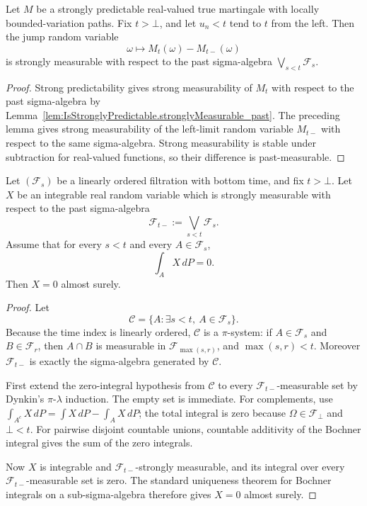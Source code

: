 \begin{lemma}\label{lem:Martingale.stronglyMeasurable_jump_leftLim_past_of_left_approach}
Let \(M\) be a strongly predictable real-valued true martingale with locally
bounded-variation paths.  Fix \(t>\bot\), and let \(u_n<t\) tend to \(t\)
from the left.  Then the jump random variable
\[
  \omega\longmapsto M_t(\omega)-M_{t-}(\omega)
\]
is strongly measurable with respect to the past sigma-algebra
\(\bigvee_{s<t}\mathcal F_s\).
\end{lemma}

\begin{proof}
Strong predictability gives strong measurability of \(M_t\) with respect to
the past sigma-algebra by
Lemma~\ref{lem:IsStronglyPredictable.stronglyMeasurable_past}.  The preceding
lemma gives strong measurability of the left-limit random variable
\(M_{t-}\) with respect to the same sigma-algebra.  Strong measurability is
stable under subtraction for real-valued functions, so their difference is
past-measurable.
\end{proof}

\begin{lemma}\label{lem:Filtration.ae_eq_zero_of_past_setIntegral_eq_zero}
Let \((\mathcal F_s)\) be a linearly ordered filtration with bottom time, and
fix \(t>\bot\).  Let \(X\) be an integrable real random variable which is
strongly measurable with respect to the past sigma-algebra
\[
  \mathcal F_{t-}:=\bigvee_{s<t}\mathcal F_s .
\]
Assume that for every \(s<t\) and every \(A\in\mathcal F_s\),
\[
  \int_A X\,dP=0 .
\]
Then \(X=0\) almost surely.
\end{lemma}

\begin{proof}
Let
\[
  \mathcal C=\{A:\exists s<t,\ A\in\mathcal F_s\}.
\]
Because the time index is linearly ordered, \(\mathcal C\) is a
\(\pi\)-system: if \(A\in\mathcal F_s\) and \(B\in\mathcal F_r\), then
\(A\cap B\) is measurable in \(\mathcal F_{\max(s,r)}\), and
\(\max(s,r)<t\).  Moreover
\(\mathcal F_{t-}\) is exactly the sigma-algebra generated by
\(\mathcal C\).

First extend the zero-integral hypothesis from \(\mathcal C\) to every
\(\mathcal F_{t-}\)-measurable set by Dynkin's \(\pi\)-\(\lambda\)
induction.  The empty set is immediate.  For complements, use
\(\int_{A^c}X\,dP=\int X\,dP-\int_A X\,dP\); the total integral is zero
because \(\Omega\in\mathcal F_\bot\) and \(\bot<t\).  For pairwise disjoint
countable unions, countable additivity of the Bochner integral gives the sum
of the zero integrals.

Now \(X\) is integrable and \(\mathcal F_{t-}\)-strongly measurable, and its
integral over every \(\mathcal F_{t-}\)-measurable set is zero.  The standard
uniqueness theorem for Bochner integrals on a sub-sigma-algebra therefore
gives \(X=0\) almost surely.
\end{proof}

